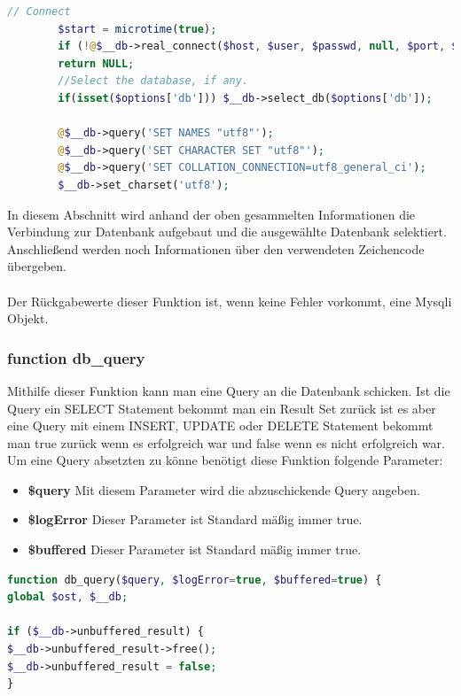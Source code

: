 \begin{lstlisting}[language=PHP, caption=mysqli.php/function-db\_connect4, firstnumber=63]
	    // Connect
	    $start = microtime(true);
	    if (!@$__db->real_connect($host, $user, $passwd, null, $port, $socket))
	    return NULL;
	    //Select the database, if any.
	    if(isset($options['db'])) $__db->select_db($options['db']);
	    
	    @$__db->query('SET NAMES "utf8"');
	    @$__db->query('SET CHARACTER SET "utf8"');
	    @$__db->query('SET COLLATION_CONNECTION=utf8_general_ci');
	    $__db->set_charset('utf8');
\end{lstlisting}
In diesem Abschnitt wird anhand der oben gesammelten Informationen die Verbindung zur Datenbank aufgebaut und die ausgewählte Datenbank selektiert.\\
Anschließend werden noch Informationen über den verwendeten Zeichencode übergeben.\\
\\
Der Rückgabewerte dieser Funktion ist, wenn keine Fehler vorkommt, eine Mysqli Objekt. 
\newpage

\subsubsection{function db\_query}

Mithilfe dieser Funktion kann man eine Query an die Datenbank schicken. Ist die Query ein SELECT Statement bekommt man ein Result Set zurück ist es aber eine Query mit einem INSERT, UPDATE oder DELETE Statement bekommt man true zurück wenn es erfolgreich war und false wenn es nicht erfolgreich war. Um eine Query absetzten zu könne benötigt diese Funktion folgende Parameter:
\begin{itemize}
	\item \textbf{\$query} Mit diesem Parameter wird die abzuschickende Query angeben.
	\item \textbf{\$logError} Dieser Parameter ist Standard mäßig immer true.
	\item \textbf{\$buffered} Dieser Parameter ist Standard mäßig immer true.
\end{itemize}

\begin{lstlisting}[language=PHP, caption=mysqli.php/function-db\_query1, firstnumber=154]
function db_query($query, $logError=true, $buffered=true) {
global $ost, $__db;

if ($__db->unbuffered_result) {
$__db->unbuffered_result->free();
$__db->unbuffered_result = false;
}
\end{lstlisting}

